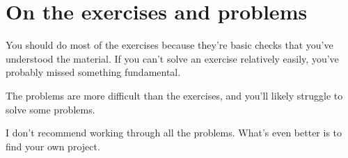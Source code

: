 \documentclass[a4paper,twoside,10pt]{book}
\begin{document}
\chapter*{On the exercises and problems}

You should do most of the exercises because they're basic checks that you've understood the material. If you can't solve an exercise relatively easily, you've probably missed something fundamental.

The problems are more difficult than the exercises, and you'll likely struggle to solve some problems.

I don't recommend working through all the problems. What's even better is to find your own project.
\end{document}
